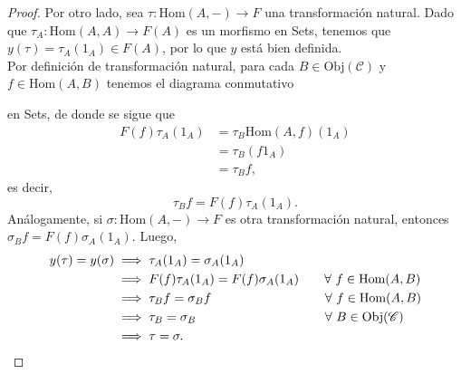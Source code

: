 \documentclass[tesis]{subfiles}
\begin{document}
\begin{proof}
    Por otro lado, sea $\tau:\text{Hom}(A,-)\to F$ una transformación natural. Dado que $\tau_A:\text{Hom}(A,A)\to F(A)$ es un morfismo en Sets, tenemos que $y(\tau) = \tau_A(1_A)\in F(A)$, por lo que $y$ está bien definida. \\

    Por definición de transformación natural, para cada $B\in\text{Obj}(\mathscr{C})$ y $f\in\text{Hom}(A,B)$ tenemos el diagrama conmutativo
    \begin{center}
    \end{center}
    en Sets, de donde se sigue que
    \begin{align*}
        F(f)\tau_A(1_A) &= \tau_B\text{Hom}(A,f)(1_A) \\
                        &= \tau_B(f1_A) \\
                        &= \tau_Bf,
    \end{align*}
    es decir,
    \begin{equation}\label{eq: Lema de Yoneda 3}
        \tau_B f = F(f)\tau_A(1_A).
    \end{equation}
    Análogamente, si $\sigma:\text{Hom}(A,-)\to F$ es otra transformación natural, entonces $\sigma_B f = F(f)\sigma_A(1_A)$. Luego,
    \begin{align*}
        y(\tau) = y(\sigma) &\implies \tau_A(1_A) = \sigma_A(1_A) \\
                            &\implies F(f)\tau_A(1_A) = F(f)\sigma_A(1_A) \quad \quad \forall \ f\in \text{Hom}(A,B) \\
                            &\implies \tau_Bf = \sigma_Bf \quad \quad \quad \quad \quad \quad \hspace{10.4mm} \forall \ f\in \text{Hom}(A,B) \\
                            &\implies \tau_B = \sigma_B \hspace{21.6mm} \quad \quad \quad \quad \forall \ B\in\text{Obj}(\mathscr{C}) \\
                            &\implies \tau = \sigma.
    \end{align*}


\end{proof}
\end{document}
